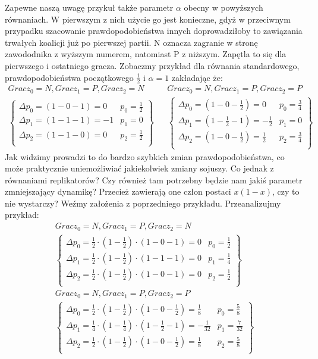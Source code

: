 Zapewne naszą uwagę przykuł także parametr $\alpha$ obecny w powyższych równaniach. W pierwszym z nich użycie go jest konieczne, gdyż w przeciwnym przypadku szacowanie prawdopodobieństwa innych doprowadziłoby to zawiązania trwałych koalicji już po pierwszej partii. N oznacza zagranie w stronę zawododnika z wyższym numerem, natomiast P z niższym. Zapętla to się dla pierwszego i ostatniego gracza. Zobaczmy przykład dla równania standardowego, prawdopodobieństwa początkowego $\frac{1}{2}$ i $\alpha = 1$ zakładając że:
\begin{align*}
Gracz_0 = N, Gracz_1 = P, Gracz_2 = N && Gracz_0 = N, Gracz_1 = P, Gracz_2 = P\\
\left\{
\begin{array}{ll}
\Delta p_0 = (1 - 0 - 1) =  0 & p_0=\frac{1}{2}\\
\Delta p_1 = (1 - 1 - 1) =  -1 & p_1= 0\\
\Delta p_2 = (1 - 1 - 0) =  0 & p_2=\frac{1}{2}\\
\end{array} 
\right\} &&
\left\{
\begin{array}{ll}
\Delta p_0 = (1 - 0 - \frac{1}{2}) =  0 & p_0=\frac{3}{4}\\
\Delta p_1 = (1 - \frac{1}{2} - 1) =  -\frac{1}{2} & p_1= 0\\
\Delta p_2 = (1 - 0 - \frac{1}{2}) =  \frac{1}{2} & p_2=\frac{3}{4}\\
\end{array}
\right\}
\end{align*}
Jak widzimy prowadzi to do bardzo szybkich zmian prawdopodobieństwa, co może praktycznie uniemożliwiać jakiekolwiek zmiany sojuszy. Co jednak z równaniami replikatorów? Czy również tam potrzebny będzie nam jakiś parametr zmniejszający dynamikę? Przecież zawierają one człon postaci $x(1-x)$, czy to nie wystarczy? Weźmy założenia z poprzedniego przykładu. Przeanalizujmy przykład: 
\begin{align*}
Gracz_0 = N, Gracz_1 = P, Gracz_2 = N \\
\left\{
\begin{array}{ll}
\Delta p_0 = \frac{1}{2} \cdot (1 - \frac{1}{2}) \cdot (1 - 0 - 1) =  0 & p_0=\frac{1}{2}\\
\Delta p_1 = \frac{1}{2} \cdot (1 - \frac{1}{2}) \cdot (1 - 1 - 1) =  0 & p_1= \frac{1}{4}\\
\Delta p_2 = \frac{1}{2} \cdot (1 - \frac{1}{2}) \cdot (1 - 0 - 1) =  0 & p_2=\frac{1}{2}\\
\end{array} 
\right\}
\\
Gracz_0 = N, Gracz_1 = P, Gracz_2 = P \\
\left\{
\begin{array}{ll}
\Delta p_0 = \frac{1}{2} \cdot (1 - \frac{1}{2}) \cdot (1 - 0 - \frac{1}{2}) = \frac{1}{8} & p_0=\frac{5}{8}\\
\Delta p_1 = \frac{1}{4} \cdot (1 - \frac{1}{4}) \cdot (1 - \frac{1}{2} - 1) = -\frac{1}{32} & p_1= \frac{7}{32}\\
\Delta p_2 = \frac{1}{2} \cdot (1 - \frac{1}{2}) \cdot (1 - 0 - \frac{1}{2}) = \frac{1}{8}  & p_2=\frac{5}{8}\\
\end{array}
\right\}
\end{align*}
